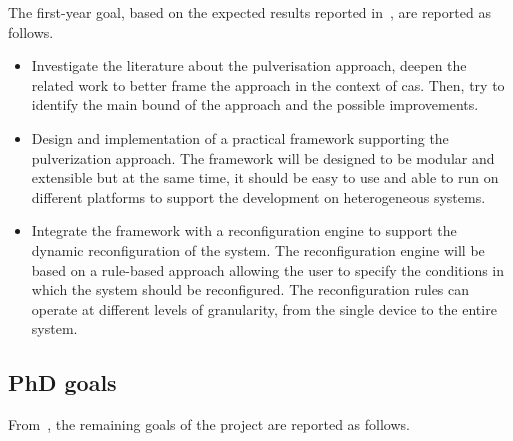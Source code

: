 \documentclass[12pt]{article}
\begin{document}
The first-year goal,
based on the expected results reported in~,
are reported as follows.

\begin{itemize}
	\item Investigate the literature about the pulverisation approach,
		deepen the related work to better frame the approach in the context of \ac{cas}.
		Then, try to identify the main bound of the approach and the possible improvements.
	\item Design and implementation of a practical framework supporting the pulverization approach.
		The framework will be designed to be modular and extensible but at the same time,
		it should be easy to use and able to run on different platforms to support the development on heterogeneous systems.
	\item Integrate the framework with a reconfiguration engine to support the dynamic reconfiguration of the system.
		The reconfiguration engine will be based on a rule-based approach allowing the user to specify the conditions in which the system should be reconfigured.
		The reconfiguration rules can operate at different levels of granularity,
		from the single device to the entire system.
\end{itemize}

\subsection{PhD goals}\label{subsec:phd-activities}

From~,
the remaining goals of the project are reported as follows.
\end{document}
